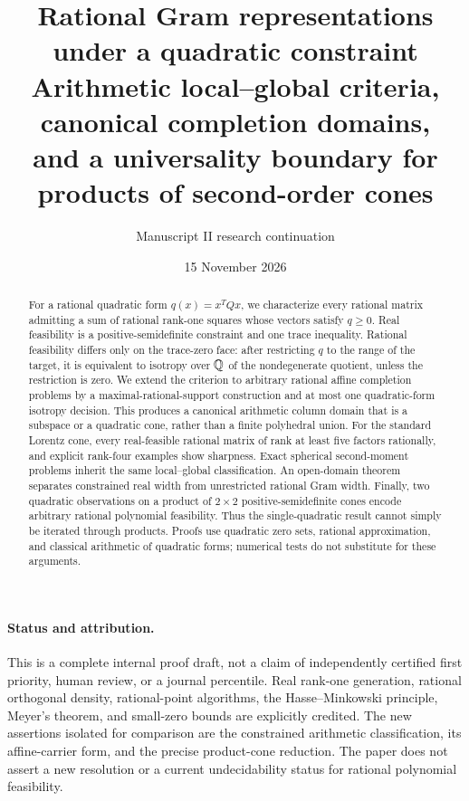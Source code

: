 \documentclass[11pt]{article}
\title{Rational Gram representations under a quadratic constraint\\\large Arithmetic local--global criteria, canonical completion domains,\\and a universality boundary for products of second-order cones}
\author{Manuscript II research continuation}
\date{15 November 2026}
\theoremstyle{remark}\newtheorem{remark}[theorem]{Remark}
\begin{document}
\maketitle
\begin{abstract}
For a rational quadratic form $q(x)=x^TQx$, we characterize every rational matrix admitting a sum of rational rank-one squares whose vectors satisfy $q\geq0$. Real feasibility is a positive-semidefinite constraint and one trace inequality. Rational feasibility differs only on the trace-zero face: after restricting $q$ to the range of the target, it is equivalent to isotropy over $\mathbb Q$ of the nondegenerate quotient, unless the restriction is zero. We extend the criterion to arbitrary rational affine completion problems by a maximal-rational-support construction and at most one quadratic-form isotropy decision. This produces a canonical arithmetic column domain that is a subspace or a quadratic cone, rather than a finite polyhedral union. For the standard Lorentz cone, every real-feasible rational matrix of rank at least five factors rationally, and explicit rank-four examples show sharpness. Exact spherical second-moment problems inherit the same local--global classification. An open-domain theorem separates constrained real width from unrestricted rational Gram width. Finally, two quadratic observations on a product of $2\times2$ positive-semidefinite cones encode arbitrary rational polynomial feasibility. Thus the single-quadratic result cannot simply be iterated through products. Proofs use quadratic zero sets, rational approximation, and classical arithmetic of quadratic forms; numerical tests do not substitute for these arguments.
\end{abstract}
\paragraph{Status and attribution.} This is a complete internal proof draft, not a claim of independently certified first priority, human review, or a journal percentile. Real rank-one generation, rational orthogonal density, rational-point algorithms, the Hasse--Minkowski principle, Meyer's theorem, and small-zero bounds are explicitly credited. The new assertions isolated for comparison are the constrained arithmetic classification, its affine-carrier form, and the precise product-cone reduction. The paper does not assert a new resolution or a current undecidability status for rational polynomial feasibility.
\tableofcontents







\end{document}
